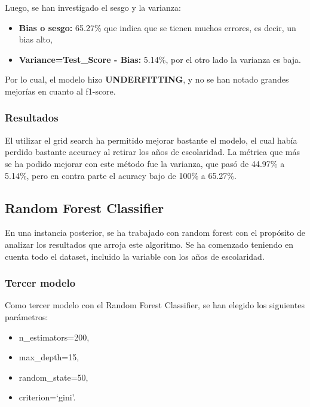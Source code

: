 \documentclass[a4paper]{article}
\begin{document}
            Luego, se han investigado el sesgo y la varianza:
            \begin{itemize}
                \item \textbf{Bias o sesgo:} 65.27\% que indica que se tienen muchos errores, es decir, un bias alto,
                \item \textbf{Variance=Test\_Score - Bias:} 5.14\%, por el otro lado la varianza es baja.
            \end{itemize}

            Por lo cual, el modelo hizo \textbf{UNDERFITTING}, y no se han notado grandes mejorías en cuanto al f1-score.

            \subsubsection*{Resultados}

            El utilizar el grid search ha permitido mejorar bastante el modelo, el cual había perdido bastante accuracy al retirar los años de escolaridad. La métrica que más se ha podido mejorar con este método fue la varianza, que pasó de 44.97\% a 5.14\%, pero en contra parte el acuracy bajo de 100\% a 65.27\%.

    \subsection{Random Forest Classifier}
        
        En una instancia posterior, se ha trabajado con random forest con el propósito de analizar los resultados que arroja este algoritmo. Se ha comenzado teniendo en cuenta todo el dataset, incluido la variable con los años de escolaridad. 

        \subsubsection{Tercer modelo}

            Como tercer modelo con el Random Forest Classifier, se han elegido los siguientes parámetros:
            \begin{itemize}
                \item n\_estimators=200,
                \item max\_depth=15,
                \item random\_state=50,
                \item criterion=`gini'.
            \end{itemize}
\end{document}
